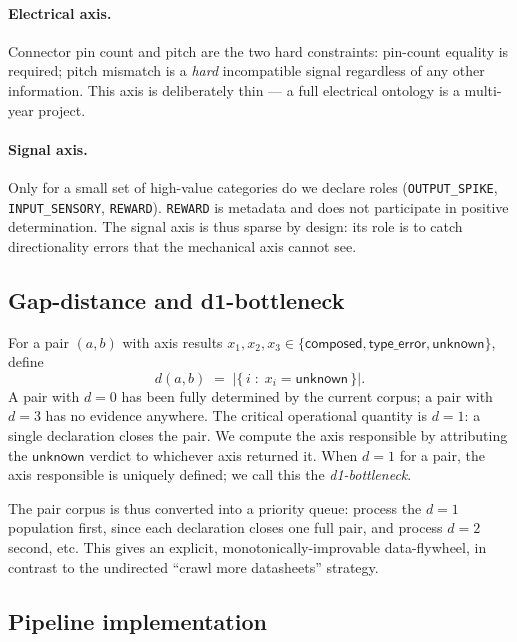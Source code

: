 \documentclass[review]{elsarticle}
\begin{document}
\paragraph{Electrical axis.}
Connector pin count and pitch are the two hard constraints: pin-count
equality is required; pitch mismatch is a \emph{hard} incompatible
signal regardless of any other information. This axis is deliberately
thin — a full electrical ontology is a multi-year project.

\paragraph{Signal axis.}
Only for a small set of high-value categories do we declare roles
(\texttt{OUTPUT\_SPIKE}, \texttt{INPUT\_SENSORY}, \texttt{REWARD}).
\texttt{REWARD} is metadata and does not participate in positive
determination. The signal axis is thus sparse by design: its role is
to catch directionality errors that the mechanical axis cannot see.

\subsection{Gap-distance and d1-bottleneck}

For a pair $(a, b)$ with axis results $x_1, x_2, x_3 \in
\{\mathsf{composed}, \mathsf{type\_error}, \mathsf{unknown}\}$,
define
\begin{equation}
  d(a, b) \;=\; |\{\, i \;:\; x_i = \mathsf{unknown}\,\}|.
  \label{eq:gapd}
\end{equation}
A pair with $d=0$ has been fully determined by the current corpus;
a pair with $d=3$ has no evidence anywhere. The critical
operational quantity is $d=1$: a single declaration closes the pair.
We compute the axis responsible by attributing the $\mathsf{unknown}$
verdict to whichever axis returned it. When $d=1$ for a pair, the
axis responsible is uniquely defined; we call this the
\emph{d1-bottleneck}.

The pair corpus is thus converted into a priority queue: process
the $d=1$ population first, since each declaration closes one full
pair, and process $d=2$ second, etc. This gives an explicit,
monotonically-improvable data-flywheel, in contrast to the
undirected ``crawl more datasheets'' strategy.

\subsection{Pipeline implementation}
\end{document}
